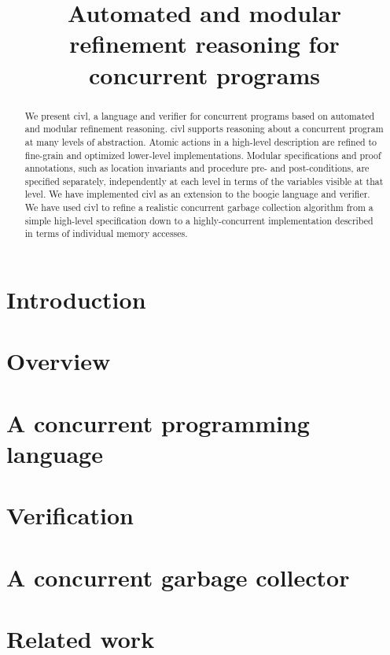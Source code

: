 \documentclass [preprint]{sigplanconf}
\theoremstyle{remark}
\theoremstyle{definition}
\newcommand{\civl}{{\sc civl}\xspace}
\newcommand{\boogie}{{\sc boogie}\xspace}
\begin{document}
\setlength{\pdfpageheight}{\paperheight}
\setlength{\pdfpagewidth}{\paperwidth}


\title{Automated and modular refinement reasoning for concurrent programs}

\maketitle



\begin{abstract}
We present \civl, a language and verifier for concurrent programs based on automated and modular refinement reasoning.  
\civl supports reasoning about a concurrent program at many levels of abstraction. 
Atomic actions in a high-level description are refined to fine-grain and optimized lower-level implementations. 
Modular specifications and proof annotations, such as location invariants and procedure pre- and post-conditions, 
are specified separately, independently at each level in terms of the variables visible at that level. 
We have implemented \civl as an extension to the \boogie language and verifier.
We have used \civl to refine a realistic concurrent garbage collection algorithm
from a simple high-level specification down to a highly-concurrent implementation described in terms of individual memory accesses.
\end{abstract}

\section{Introduction}
\label{sec:introduction}

\section{Overview}
\label{sec:overview}

\section{A concurrent programming language}
\label{sec:language}

\section{Verification}
\label{sec:verification}

\section{A concurrent garbage collector}
\label{sec:gc}


\section{Related work}
\label{sec:related}




\end{document}
